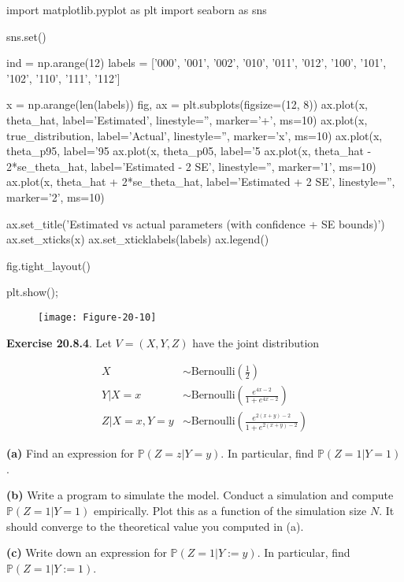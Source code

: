 \begin{python}
import matplotlib.pyplot as plt
import seaborn as sns

sns.set()

ind = np.arange(12)
labels = ['000', '001', '002', '010', '011', '012', '100', '101', '102', '110', '111', '112']

x = np.arange(len(labels))
fig, ax = plt.subplots(figsize=(12, 8))
ax.plot(x, theta_hat, label='Estimated', linestyle='', marker='+', ms=10)
ax.plot(x, true_distribution, label='Actual', linestyle='', marker='x', ms=10)
ax.plot(x, theta_p95, label='95%
ax.plot(x, theta_p05, label='5%
ax.plot(x, theta_hat - 2*se_theta_hat, label='Estimated - 2 SE', linestyle='', marker='1', ms=10)
ax.plot(x, theta_hat + 2*se_theta_hat, label='Estimated + 2 SE', linestyle='', marker='2', ms=10)

ax.set_title('Estimated vs actual parameters (with confidence + SE bounds)')
ax.set_xticks(x)
ax.set_xticklabels(labels)
ax.legend()

fig.tight_layout()

plt.show();
\end{python}

\begin{figure}[H]
\texttt{[image: Figure-20-10]}
\end{figure}

\textbf{Exercise 20.8.4}. Let \(V = (X, Y, Z)\) have the joint
distribution

\[
\begin{align}
X &\sim \text{Bernoulli}\left(\frac{1}{2}\right) \\
Y | X = x &\sim \text{Bernoulli}\left(\frac{e^{4x - 2}}{1 + e^{4x - 2}}\right) \\
Z | X = x, Y = y &\sim \text{Bernoulli}\left(\frac{e^{2(x+y)-2}}{1 + e^{2(x+y)-2}}\right)
\end{align}
\]

\textbf{(a)} Find an expression for \(\mathbb{P}(Z = z | Y = y)\). In
particular, find \(\mathbb{P}(Z = 1 | Y = 1)\).

\textbf{(b)} Write a program to simulate the model. Conduct a simulation
and compute \(\mathbb{P}(Z = 1 | Y = 1)\) empirically. Plot this as a
function of the simulation size \(N\). It should converge to the
theoretical value you computed in (a).

\textbf{(c)} Write down an expression for
\(\mathbb{P}(Z = 1 | Y := y)\). In particular, find
\(\mathbb{P}(Z = 1 | Y := 1)\).

